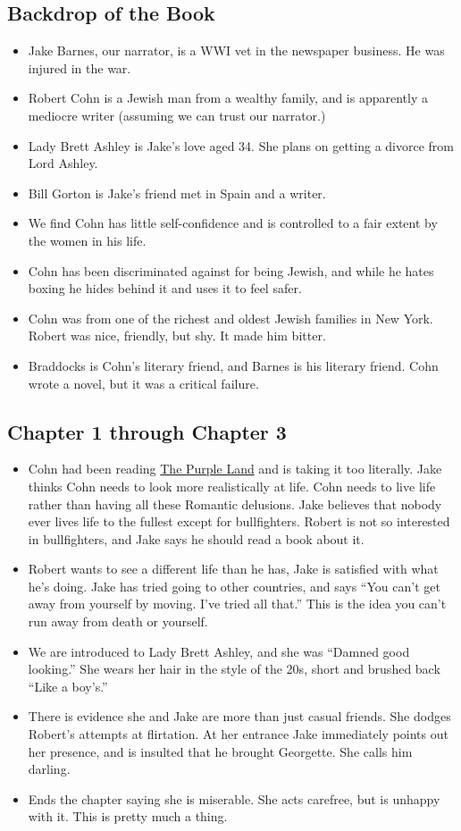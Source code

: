 \documentclass[11pt]{article}
\begin{document}
\subsection{Backdrop of the Book}
\begin{itemize}
	\item Jake Barnes, our narrator, is a WWI vet in the newspaper business.  
		He was injured in the war.
	\item Robert Cohn is a Jewish man from a wealthy family, and is apparently 
		a mediocre writer (assuming we can trust our narrator.)
	\item Lady Brett Ashley is Jake's love aged 34.  She plans on getting a 
		divorce from Lord Ashley.
	\item Bill Gorton is Jake's friend met in Spain and a writer.
	\item We find Cohn has little self-confidence and is controlled to a fair 
		extent by the women in his life.
	\item Cohn has been discriminated against for being Jewish, and while he 
		hates boxing he hides behind it and uses it to feel safer.
	\item Cohn was from one of the richest and oldest Jewish families in New 
		York.  Robert was nice, friendly, but shy.  It made him bitter.
	\item Braddocks is Cohn's literary friend, and Barnes is his literary 
		friend.  Cohn wrote a novel, but it was a critical failure.
\end{itemize}
\subsection{Chapter 1 through Chapter 3}
\begin{itemize}
	\item Cohn had been reading \underline{The Purple Land} and is taking it 
		too literally.  Jake thinks Cohn needs to look more realistically at 
		life.  Cohn needs to live life rather than having all these Romantic 
		delusions.  Jake believes that nobody ever lives life to the fullest 
		except for bullfighters.  Robert is not so interested in bullfighters, 
		and Jake says he should read a book about it.
	\item Robert wants to see a different life than he has, Jake is satisfied 
		with what he's doing.  Jake has tried going to other countries, and 
		says ``You can't get away from yourself by moving.  I've tried all 
		that.''  This is the idea you can't run away from death or yourself.
	\item We are introduced to Lady Brett Ashley, and she was ``Damned good 
		looking.''  She wears her hair in the style of the 20s, short and 
		brushed back ``Like a boy's.''
	\item There is evidence she and Jake are more than just casual friends.  
		She dodges Robert's attempts at flirtation.  At her entrance Jake 
		immediately points out her presence, and is insulted that he brought 
		Georgette.  She calls him darling.
	\item Ends the chapter saying she is miserable.  She acts carefree, but is 
		unhappy with it.  This is pretty much a thing.
\end{itemize}
\end{document}
